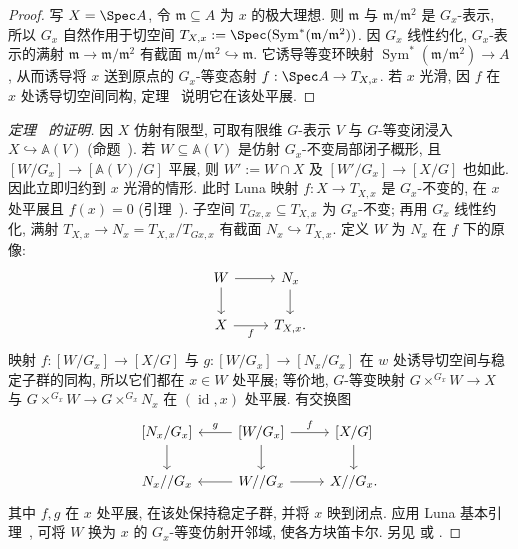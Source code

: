 \begin{proof}
写 $X=\Spec A$, 令 $\mathfrak m\subseteq A$ 为 $x$ 的极大理想. 则 $\mathfrak m$ 与 $\mathfrak m/\mathfrak m^2$ 是 $G_x$-表示, 所以 $G_x$ 自然作用于切空间 $T_{X,x}:=\Spec(\operatorname{Sym}^*(\mathfrak m/\mathfrak m^2))$. 因 $G_x$ 线性约化, $G_x$-表示的满射 $\mathfrak m\to\mathfrak m/\mathfrak m^2$ 有截面 $\mathfrak m/\mathfrak m^2\hookrightarrow\mathfrak m$. 它诱导等变环映射 $\operatorname{Sym}^*(\mathfrak m/\mathfrak m^2)\to A$, 从而诱导将 $x$ 送到原点的 $G_x$-等变态射 $f:\Spec A\to T_{X,x}$. 若 $x$ 光滑, 因 $f$ 在 $x$ 处诱导切空间同构, 定理~ 说明它在该处平展.
\end{proof}
\begin{proof}[定理~ 的证明]
因 $X$ 仿射有限型, 可取有限维 $G$-表示 $V$ 与 $G$-等变闭浸入 $X\hookrightarrow\mathbb A(V)$ (命题~). 若 $W\subseteq\mathbb A(V)$ 是仿射 $G_x$-不变局部闭子概形, 且 $[W/G_x]\to[\mathbb A(V)/G]$ 平展, 则 $W':=W\cap X$ 及 $[W'/G_x]\to[X/G]$ 也如此. 因此立即归约到 $x$ 光滑的情形. 此时 Luna 映射 $f:X\to T_{X,x}$ 是 $G_x$-不变的, 在 $x$ 处平展且 $f(x)=0$ (引理~). 子空间 $T_{Gx,x}\subseteq T_{X,x}$ 为 $G_x$-不变; 再用 $G_x$ 线性约化, 满射 $T_{X,x}\to N_x=T_{X,x}/T_{Gx,x}$ 有截面 $N_x\hookrightarrow T_{X,x}$. 定义 $W$ 为 $N_x$ 在 $f$ 下的原像:
\begin{align*}
\begin{tikzcd}[ampersand replacement=\&]
W\arrow[r]\arrow[d]\&N_x\arrow[d]\\
X\arrow[r,"{f}"']\&T_{X,x}.
\end{tikzcd}
\end{align*}
映射 $f:[W/G_x]\to[X/G]$ 与 $g:[W/G_x]\to[N_x/G_x]$ 在 $w$ 处诱导切空间与稳定子群的同构, 所以它们都在 $x\in W$ 处平展; 等价地, $G$-等变映射 $G\times^{G_x}W\to X$ 与 $G\times^{G_x}W\to G\times^{G_x}N_x$ 在 $(\operatorname{id},x)$ 处平展. 有交换图
\begin{align*}
\begin{tikzcd}[ampersand replacement=\&]
{[N_x/G_x]}\arrow[d]\&{[W/G_x]}\arrow[l,"{g}"']\arrow[r,"{f}"]\arrow[d]\&{[X/G]}\arrow[d]\\
N_x//G_x\&W//G_x\arrow[l]\arrow[r]\&X//G_x.
\end{tikzcd}
\end{align*}
其中 $f,g$ 在 $x$ 处平展, 在该处保持稳定子群, 并将 $x$ 映到闭点. 应用 Luna 基本引理~, 可将 $W$ 换为 $x$ 的 $G_x$-等变仿射开邻域, 使各方块笛卡尔. 另见 \cite[第 97 页]{Lun73} 或 \cite[定理 5.3]{Dré04}.
\end{proof}
